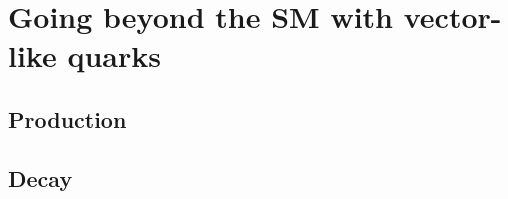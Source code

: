 

\section{Going beyond the SM with vector-like quarks}\label{sec:THvlq}

\cite{AguilarSaavedra:2009es,Martin:2009bg}

\subsection{Production}\label{sec:vlqprod}


\subsection{Decay}\label{sec:vlqdecay}



